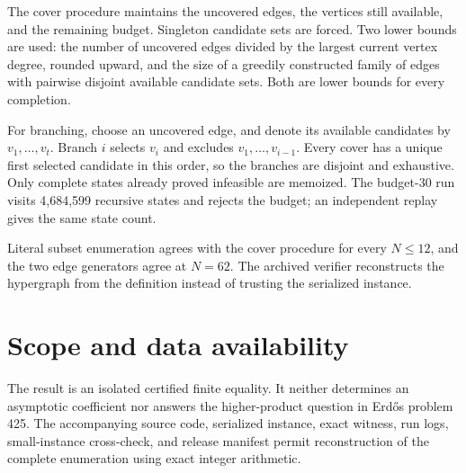 \documentclass[11pt]{amsart}
\theoremstyle{definition}
\begin{document}
The cover procedure maintains the uncovered edges, the vertices still
available, and the remaining budget.  Singleton candidate sets are forced.
Two lower bounds are used: the number of uncovered edges divided by the
largest current vertex degree, rounded upward, and the size of a greedily
constructed family of edges with pairwise disjoint available candidate sets.
Both are lower bounds for every completion.

For branching, choose an uncovered edge, and denote its available candidates
by $v_1,\ldots,v_t$.  Branch $i$ selects $v_i$ and excludes
$v_1,\ldots,v_{i-1}$.  Every cover has a unique first selected candidate in
this order, so the branches are disjoint and exhaustive.  Only complete
states already proved infeasible are memoized.  The budget-30 run visits
4,684,599 recursive states and rejects the budget; an independent replay
gives the same state count.

Literal subset enumeration agrees with the cover procedure for every
$N\leq12$, and the two edge generators agree at $N=62$.  The archived verifier
reconstructs the hypergraph from the definition instead of trusting the
serialized instance.

\section{Scope and data availability}
The result is an isolated certified finite equality.  It neither determines
an asymptotic coefficient nor answers the higher-product question in
Erd\H{o}s problem 425.  The accompanying source code, serialized instance,
exact witness, run logs, small-instance cross-check, and release manifest
permit reconstruction of the complete enumeration using exact integer
arithmetic.



\end{document}
